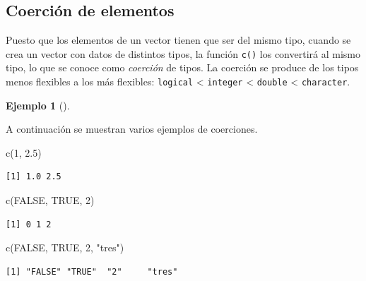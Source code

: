 \documentclass[
  a4paper,
]{scrreport}
\newenvironment{Shaded}{\begin{snugshade}}{\end{snugshade}}
\newcommand{\ConstantTok}[1]{\textcolor[rgb]{0.56,0.35,0.01}{#1}}
\newcommand{\DecValTok}[1]{\textcolor[rgb]{0.68,0.00,0.00}{#1}}
\newcommand{\FloatTok}[1]{\textcolor[rgb]{0.68,0.00,0.00}{#1}}
\newcommand{\FunctionTok}[1]{\textcolor[rgb]{0.28,0.35,0.67}{#1}}
\newcommand{\NormalTok}[1]{\textcolor[rgb]{0.00,0.23,0.31}{#1}}
\newcommand{\StringTok}[1]{\textcolor[rgb]{0.13,0.47,0.30}{#1}}
\theoremstyle{definition}
\newtheorem{example}{Ejemplo}[chapter]
\theoremstyle{definition}
\theoremstyle{remark}
\begin{document}
\hypertarget{coerciuxf3n-de-elementos}{%
\subsection{Coerción de elementos}\label{coerciuxf3n-de-elementos}}

Puesto que los elementos de un vector tienen que ser del mismo tipo,
cuando se crea un vector con datos de distintos tipos, la función
\texttt{c()} los convertirá al mismo tipo, lo que se conoce como
\emph{coerción} de tipos. La coerción se produce de los tipos menos
flexibles a los más flexibles: \texttt{logical} \textless{}
\texttt{integer} \textless{} \texttt{double} \textless{}
\texttt{character}.

\leavevmode{}%
\begin{example}[]\label{exm-coercion}

A continuación se muestran varios ejemplos de coerciones.

\begin{Shaded}
\begin{Highlighting}[]
\FunctionTok{c}\NormalTok{(}\DecValTok{1}\NormalTok{, }\FloatTok{2.5}\NormalTok{)}
\end{Highlighting}
\end{Shaded}

\begin{verbatim}
[1] 1.0 2.5
\end{verbatim}

\begin{Shaded}
\begin{Highlighting}[]
\FunctionTok{c}\NormalTok{(}\ConstantTok{FALSE}\NormalTok{, }\ConstantTok{TRUE}\NormalTok{, }\DecValTok{2}\NormalTok{)}
\end{Highlighting}
\end{Shaded}

\begin{verbatim}
[1] 0 1 2
\end{verbatim}

\begin{Shaded}
\begin{Highlighting}[]
\FunctionTok{c}\NormalTok{(}\ConstantTok{FALSE}\NormalTok{, }\ConstantTok{TRUE}\NormalTok{, }\DecValTok{2}\NormalTok{, }\StringTok{"tres"}\NormalTok{)}
\end{Highlighting}
\end{Shaded}

\begin{verbatim}
[1] "FALSE" "TRUE"  "2"     "tres" 
\end{verbatim}

\end{example}
\end{document}

